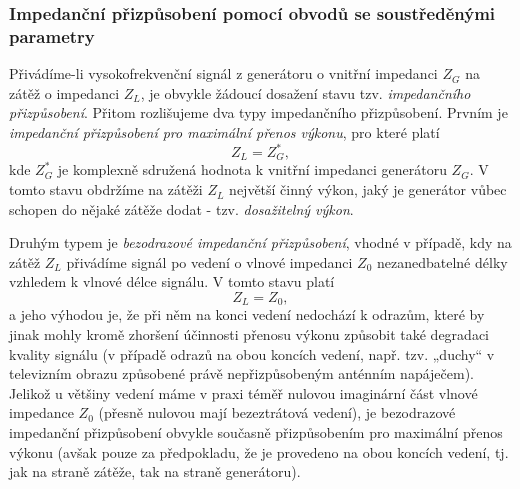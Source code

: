       \subsubsection{Impedanční přizpůsobení pomocí obvodů se soustředěnými parametry}
        Přivádíme-li vysokofrekvenční signál z generátoru o vnitřní impedanci \(Z_G\) na zátěž o 
        impedanci \(Z_L\), je obvykle žádoucí dosažení stavu tzv. \emph{impedančního přizpůsobení}. 
        Přitom rozlišujeme dva typy impedančního přizpůsobení. Prvním je \emph{impedanční 
        přizpůsobení pro maximální přenos výkonu}, pro které platí
        \begin{equation}\label{RA:eq_smith05}
          Z_L = Z^*_G,
        \end{equation}  
        kde \(Z^*_G\) je komplexně sdružená hodnota k vnitřní impedanci generátoru \(Z_G\). V tomto 
        stavu obdržíme na zátěži \(Z_L\) největší činný výkon, jaký je generátor vůbec schopen do 
        nějaké zátěže dodat - tzv. \emph{dosažitelný výkon}.
  
        Druhým typem je \emph{bezodrazové impedanční přizpůsobení}, vhodné v případě, kdy na zátěž 
        \(Z_L\) přivádíme signál po vedení o vlnové impedanci \(Z_0\) nezanedbatelné délky vzhledem 
        k vlnové délce signálu. V tomto stavu platí
        \begin{equation}\label{RA:eq_smith06}
          Z_L = Z_0,
        \end{equation}  
        a jeho výhodou je, že při něm na konci vedení nedochází k odrazům, které by jinak mohly 
        kromě zhoršení účinnosti přenosu výkonu způsobit také degradaci kvality signálu (v případě 
        odrazů na obou koncích vedení, např. tzv. „duchy“ v televizním obrazu způsobené právě 
        nepřizpůsobeným anténním napáječem). Jelikož u většiny vedení máme v praxi téměř nulovou 
        imaginární část vlnové impedance \(Z_0\) (přesně nulovou mají bezeztrátová vedení), je 
        bezodrazové impedanční přizpůsobení obvykle současně přizpůsobením pro maximální přenos 
        výkonu (avšak pouze za předpokladu, že je provedeno na obou koncích vedení, tj. jak na 
        straně zátěže, tak na straně generátoru).
  
